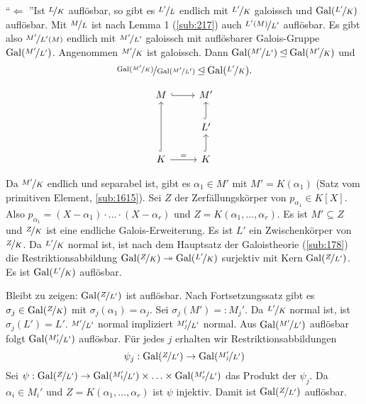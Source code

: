 \begin{enumerate}[a)]
	\begin{minipage}{0.75\textwidth}
		\enquote{$\Longleftarrow$ }Ist $\nicefrac{L}{K}$ auflösbar, so gibt es $\nicefrac{L'}{L}$ endlich mit $\nicefrac{L'}{K}$ galoissch und $\operatorname{Gal}(\nicefrac{L'}{K})$
		auflösbar. Mit $\nicefrac{M}{L}$ ist nach Lemma 1 (\ref{sub:217}) auch $\nicefrac{L'(M)}{L'}$ auflösbar. Es gibt also $\nicefrac{M'}{L'(M)}$ endlich mit 
		$\nicefrac{M'}{L'}$ galoissch mit auflösbarer Galois-Gruppe $\operatorname{Gal}(\nicefrac{M'}{L'})$.
		Angenommen $\nicefrac{M'}{K}$ ist galoissch. Dann $\operatorname{Gal}(\nicefrac{M'}{L'}) \unlhd \operatorname{Gal}(\nicefrac{M'}{K})$ und
		\[
			\nicefrac{\operatorname{Gal}(\nicefrac{M'}{K})}{\operatorname{Gal}(\nicefrac{M'}{L'})} \unlhd  \operatorname{Gal}( \nicefrac{L'}{K}).
		\]
	\end{minipage}\quad 
	\begin{minipage}{0.17\textwidth}
		\[
			\begin{tikzcd}
						M \rar[hook]&  M'\\
						  & L' \uar[hook] \\
						K \arrow[hook]{uu} \rar{=} & K \uar[hook]
			\end{tikzcd}
		\]
	\end{minipage}
	
	
	Da $\nicefrac{M'}{K}$ endlich und separabel ist, gibt es $\alpha_1 \in M'$ mit $M'=K(\alpha_1)$ (Satz vom primitiven Element, \ref{sub:1615}). Sei $Z$ der 
	Zerfällungskörper von $p_{\alpha_1} \in K[X]$. Also $p_{\alpha_1} = (X-\alpha_1) \cdot \ldots \cdot (X-\alpha_r)$ und $Z=K(\alpha_1, \ldots , \alpha_r)$.
	Es ist $M' \subseteq Z$ und $\nicefrac{Z}{K}$ ist eine endliche Galois-Erweiterung. Es ist $L'$ ein Zwischenkörper von $\nicefrac{Z}{K}$. Da $\nicefrac{L'}{K}$ normal
	ist, ist nach dem Hauptsatz der Galoistheorie (\ref{sub:178}) die Restriktionsabbildung $\operatorname{Gal}(\nicefrac{Z}{K}) \twoheadrightarrow \operatorname{Gal}(\nicefrac{L'}{K})$ surjektiv mit 
	Kern $\operatorname{Gal}(\nicefrac{Z}{L'})$. Es ist $\operatorname{Gal}(\nicefrac{L'}{K})$ auflösbar.
	
	Bleibt zu zeigen: $\operatorname{Gal}(\nicefrac{Z}{L'})$ ist auflösbar. Nach Fortsetzungssatz gibt es $\sigma_j \in \operatorname{Gal}(\nicefrac{Z}{K})$ mit $\sigma_j(\alpha_1) = \alpha_j$.
	Sei $\sigma_j(M') =: M_j'$. Da $\nicefrac{L'}{K}$ normal ist, ist $\sigma_j(L') = L'$. $\nicefrac{M'}{L'}$ normal impliziert $\nicefrac{M_j'}{L'}$ normal.
	Aus $\operatorname{Gal}(\nicefrac{M'}{L'})$ auflösbar folgt $\operatorname{Gal}(\nicefrac{M_j'}{L'})$ auflösbar. Für jedes $j$ erhalten wir Restriktionsabbildungen
	\[
		\psi_j : \operatorname{Gal} (\nicefrac{Z}{L'}) \to \operatorname{Gal}(\nicefrac{M_j'}{L'})
	\]
	Sei $\psi : \operatorname{Gal}(\nicefrac{Z}{L'}) \to \operatorname{Gal}(\nicefrac{M_1'}{L'}) \times \ldots \times \operatorname{Gal}(\nicefrac{M_r'}{L'})$ das Produkt der $\psi_j$. Da $\alpha_i \in M_i'$ und
	$Z=K(\alpha_1, \ldots , \alpha_r)$ ist $\psi$ injektiv. Damit ist $\operatorname{Gal}(\nicefrac{Z}{L'})$ auflösbar. \bewende
\end{enumerate}

